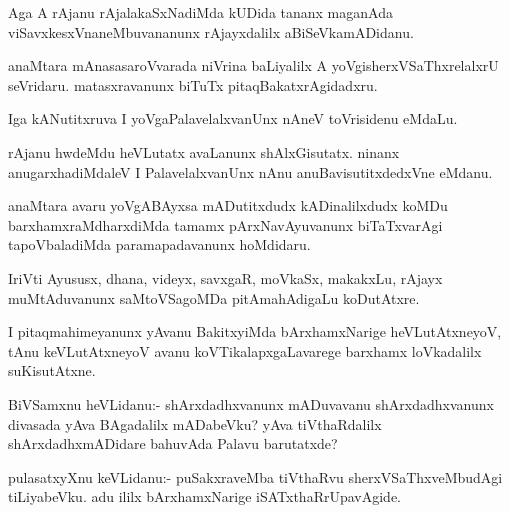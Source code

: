 \documentclass{article}
\begin{document}
\begin{mn}
Aga A rAjanu rAjalakaSxNadiMda kUDida tananx maganAda
viSavxkesxVnaneMbuvananunx rAjayxdalilx aBiSeVkamADidanu.
\end{mn}

\begin{mn}
anaMtara mAnasasaroVvarada niVrina baLiyalilx A
yoVgisherxVSaThxrelalxrU seVridaru. matasxravanunx biTuTx pitaqBakatxrAgidadxru.
\end{mn}

\begin{mn}%
Iga kANutitxruva I yoVgaPalavelalxvanUnx nAneV toVrisidenu eMdaLu.
\end{mn}

\begin{mn}
rAjanu hwdeMdu heVLutatx avaLanunx shAlxGisutatx. ninanx
anugarxhadiMdaleV I PalavelalxvanUnx nAnu anuBavisutitxdedxVne eMdanu.
\end{mn}

\begin{mn}
anaMtara avaru yoVgABAyxsa mADutitxdudx kADinalilxdudx koMDu
barxhamxraMdharxdiMda tamamx pArxNavAyuvanunx biTaTxvarAgi
tapoVbaladiMda paramapadavanunx hoMdidaru.
\end{mn}

\begin{mn}
IriVti Ayususx, dhana, videyx, savxgaR, moVkaSx, makakxLu, rAjayx
muMtAduvanunx saMtoVSagoMDa pitAmahAdigaLu koDutAtxre.
\end{mn}

\begin{mn}%
I pitaqmahimeyanunx yAvanu BakitxyiMda bArxhamxNarige heVLutAtxneyoV,
tAnu keVLutAtxneyoV avanu koVTikalapxgaLavarege barxhamx loVkadalilx suKisutAtxne.
\end{mn}

%
%


\begin{mn}%
BiVSamxnu heVLidanu:- shArxdadhxvanunx mADuvavanu shArxdadhxvanunx
divasada yAva BAgadalilx mADabeVku? yAva tiVthaRdalilx
shArxdadhxmADidare bahuvAda Palavu barutatxde?
\end{mn}

\begin{mn}
pulasatxyXnu keVLidanu:- puSakxraveMba tiVthaRvu sherxVSaThxveMbudAgi
tiLiyabeVku. adu ililx bArxhamxNarige iSATxthaRrUpavAgide.
\end{mn}
\end{document}
